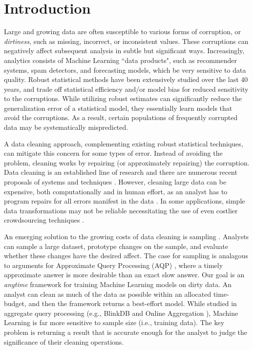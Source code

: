 \section{Introduction}
Large and growing data are often susceptible to various forms of corruption, or \emph{dirtiness}, such as missing, incorrect, or inconsistent values.
These corruptions can negatively affect subsequent analysis in subtle but significant ways.
Increasingly, analytics consists of Machine Learning ``data products", such as recommender systems, spam detectors, and forecasting models, which be very sensitive to data quality.
Robust statistical methods have been extensively studied over the last 40 years, and trade off statistical efficiency and/or model bias for reduced sensitivity to the corruptions. 
While utilizing robust estimates can significantly reduce the generalization error of a statistical model, they essentially learn models that avoid the corruptions. 
As a result, certain populations of frequently corrupted data may be systematically mispredicted.

A data cleaning approach, complementing existing robust statistical techniques, can mitigate this concern for some types of error.
Instead of avoiding the problem, cleaning works by repairing (or approximately repairing) the corruption.
Data cleaning is an established line of research and there are numerous recent proposals of systems and techniques \cite{khayyat2015bigdansing,sampleclean, chu2015katara, kandel2012}.
However, cleaning large data can be expensive, both computationally and in human effort, as an analyst has to program repairs for all errors manifest in the data \cite{kandel2012}.
In some applications, simple data transformations may not be reliable necessitating the use of even costlier crowdsourcing techniques \cite{gokhale2014corleone,park2014crowdfill}.

An emerging solution to the growing costs of data cleaning is sampling \cite{wang1999sample, trifacta, stonebraker2013data}.
Analysts can sample a large dataset, prototype changes on the sample, and evaluate whether these changes have the desired affect.
The case for sampling is analagous to arguments for Approximate Query Processing (AQP) \cite{DBLP:conf/eurosys/AgarwalMPMMS13}, where a timely approximate answer is more desirable than an exact slow answer.
Our goal is an \emph{anytime} framework for training Machine Learning models on dirty data. 
An analyst can clean as much of the data as possible within an allocated time-budget, and then the framework 
returns a best-effort model.
While studied in aggregate query processing (e.g., BlinkDB \cite{DBLP:conf/eurosys/AgarwalMPMMS13} and Online Aggregation \cite{DBLP:conf/sigmod/HellersteinHW97,DBLP:conf/sigmod/CondieCAHGTES10}), Machine Learning is far more sensitive to sample size (i.e., training data).
The key problem is returning a result that is accurate enough for the analyst to judge the significance of their cleaning operations.

